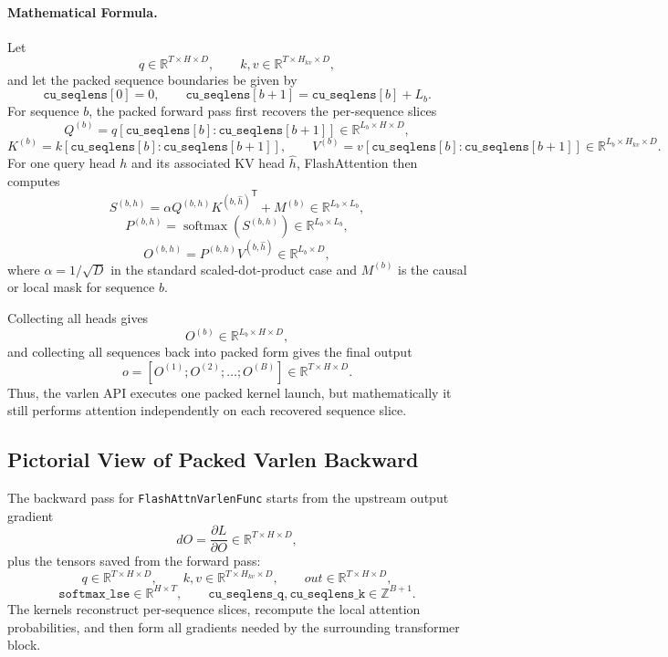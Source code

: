\documentclass[11pt]{article}
\newcommand{\R}{\mathbb{R}}
\newcommand{\softmax}{\operatorname{softmax}}
\newcommand{\trans}{\mathsf{T}}
\begin{document}
\paragraph{Mathematical Formula.}

Let
\[
q \in \R^{T \times H \times D}, \qquad
k, v \in \R^{T \times H_{kv} \times D},
\]
and let the packed sequence boundaries be given by
\[
\texttt{cu\_seqlens}[0] = 0, \qquad
\texttt{cu\_seqlens}[b+1] = \texttt{cu\_seqlens}[b] + L_b.
\]
For sequence $b$, the packed forward pass first recovers the per-sequence
slices
\[
Q^{(b)} = q[\texttt{cu\_seqlens}[b] : \texttt{cu\_seqlens}[b+1]]
\in \R^{L_b \times H \times D},
\]
\[
K^{(b)} = k[\texttt{cu\_seqlens}[b] : \texttt{cu\_seqlens}[b+1]], \qquad
V^{(b)} = v[\texttt{cu\_seqlens}[b] : \texttt{cu\_seqlens}[b+1]]
\in \R^{L_b \times H_{kv} \times D}.
\]
For one query head $h$ and its associated KV head $\hat h$, FlashAttention
then computes
\[
S^{(b,h)} = \alpha Q^{(b,h)} {K^{(b,\hat h)}}^\trans + M^{(b)}
\in \R^{L_b \times L_b},
\]
\[
P^{(b,h)} = \softmax\!\left(S^{(b,h)}\right)
\in \R^{L_b \times L_b},
\]
\[
O^{(b,h)} = P^{(b,h)} V^{(b,\hat h)}
\in \R^{L_b \times D},
\]
where $\alpha = 1 / \sqrt{D}$ in the standard scaled-dot-product case and
$M^{(b)}$ is the causal or local mask for sequence $b$.

Collecting all heads gives
\[
O^{(b)} \in \R^{L_b \times H \times D},
\]
and collecting all sequences back into packed form gives the final output
\[
o = [O^{(1)}; O^{(2)}; \ldots; O^{(B)}] \in \R^{T \times H \times D}.
\]
Thus, the varlen API executes one packed kernel launch, but mathematically it
still performs attention independently on each recovered sequence slice.

\subsection{Pictorial View of Packed Varlen Backward}

The backward pass for \texttt{FlashAttnVarlenFunc} starts from the upstream
output gradient
\[
dO = \frac{\partial L}{\partial O}
\in \R^{T \times H \times D},
\]
plus the tensors saved from the forward pass:
\[
q \in \R^{T \times H \times D}, \qquad
k,v \in \R^{T \times H_{kv} \times D}, \qquad
out \in \R^{T \times H \times D},
\]
\[
\texttt{softmax\_lse} \in \R^{H \times T}, \qquad
\texttt{cu\_seqlens\_q}, \texttt{cu\_seqlens\_k} \in \mathbb{Z}^{B+1}.
\]
The kernels reconstruct per-sequence slices, recompute the local attention
probabilities, and then form all gradients needed by the surrounding
transformer block.
\end{document}
